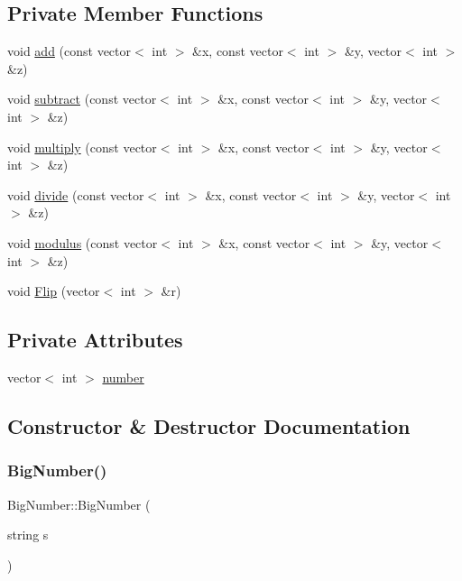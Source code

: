 \subsection*{Private Member Functions}
\begin{DoxyCompactItemize}
\item 
void \mbox{\hyperlink{class_big_number_a106884b978df72a2efed8dd0998ea4f7}{add}} (const vector$<$ int $>$ \&x, const vector$<$ int $>$ \&y, vector$<$ int $>$ \&z)
\item 
void \mbox{\hyperlink{class_big_number_aca6e58170c413393a9931ae75c9f2b49}{subtract}} (const vector$<$ int $>$ \&x, const vector$<$ int $>$ \&y, vector$<$ int $>$ \&z)
\item 
void \mbox{\hyperlink{class_big_number_a7100fbbaded92b611ebda6261d3cff9d}{multiply}} (const vector$<$ int $>$ \&x, const vector$<$ int $>$ \&y, vector$<$ int $>$ \&z)
\item 
void \mbox{\hyperlink{class_big_number_ae69ae04694d805916f92ebf9dae3f49b}{divide}} (const vector$<$ int $>$ \&x, const vector$<$ int $>$ \&y, vector$<$ int $>$ \&z)
\item 
void \mbox{\hyperlink{class_big_number_ac341f25984e6bfe4559dd6029209095c}{modulus}} (const vector$<$ int $>$ \&x, const vector$<$ int $>$ \&y, vector$<$ int $>$ \&z)
\item 
void \mbox{\hyperlink{class_big_number_a4a76b5eeaa9d6be09d2b3acaff576839}{Flip}} (vector$<$ int $>$ \&r)
\end{DoxyCompactItemize}
\subsection*{Private Attributes}
\begin{DoxyCompactItemize}
\item 
vector$<$ int $>$ \mbox{\hyperlink{class_big_number_aefe6af3de273c7e77d02f08f9f6067d0}{number}}
\end{DoxyCompactItemize}


\subsection{Constructor \& Destructor Documentation}
\mbox{\label{class_big_number_ac6701b663665e17ab6d71df11bc1cc8f}} 
\subsubsection{\texorpdfstring{Big\+Number()}{BigNumber()}\hspace{0.1cm}{\footnotesize\ttfamily [1/2]}}
{\footnotesize\ttfamily Big\+Number\+::\+Big\+Number (\begin{DoxyParamCaption}\item[{string}]{s }\end{DoxyParamCaption})}

